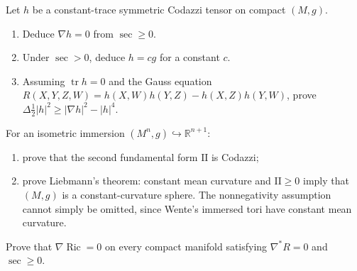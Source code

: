 \begin{remark}
  \label{rem:pet-ch9-exercise-9-6-11}

  Let $h$ be a constant-trace symmetric Codazzi tensor on compact $(M,g)$.
  \begin{enumerate}
    \item[(1)] Deduce $\nabla h=0$ from $\sec\ge0$.
    \item[(2)] Under $\sec>0$, deduce $h=cg$ for a constant $c$.
    \item[(3)] Assuming $\operatorname{tr}h=0$ and the Gauss equation
      $R(X,Y,Z,W)=h(X,W)h(Y,Z)-h(X,Z)h(Y,W)$, prove
      $\Delta\tfrac12|h|^2\ge|\nabla h|^2-|h|^4$.
  \end{enumerate}
\end{remark}

\begin{remark}
  \label{rem:pet-ch9-exercise-9-6-12}

  For an isometric immersion $(M^n,g)\hookrightarrow\mathbb R^{n+1}$:
  \begin{enumerate}
    \item[(1)] prove that the second fundamental form $\mathrm{II}$ is
      Codazzi;
    \item[(2)] prove Liebmann's theorem: constant mean curvature and
      $\mathrm{II}\ge0$ imply that $(M,g)$ is a constant-curvature sphere.
      The nonnegativity assumption cannot simply be omitted, since Wente's
      immersed tori have constant mean curvature.
  \end{enumerate}
\end{remark}

\begin{remark}
  \label{rem:pet-ch9-exercise-9-6-13}

  Prove that $\nabla\operatorname{Ric}=0$ on every compact manifold satisfying
  $\nabla^*R=0$ and $\sec\ge0$.
\end{remark}

